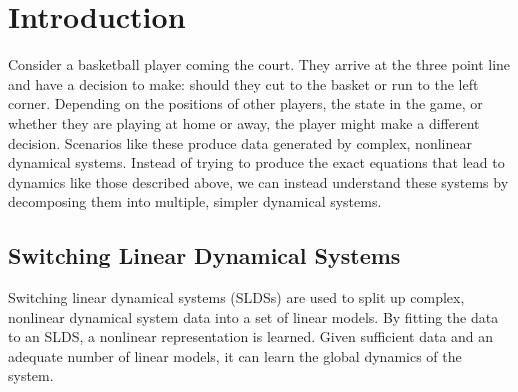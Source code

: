 
\section{Introduction}

Consider a basketball player coming the court. They arrive at the three point line and have a decision to make: should they cut to the basket or run to the left corner. Depending on the positions of other players, the state in the game, or whether they are playing at home or away, the player might make a different decision. Scenarios like these produce data generated by complex, nonlinear dynamical systems. Instead of trying to produce the exact equations that lead to dynamics like those described above, we can instead understand these systems by decomposing them into multiple, simpler dynamical systems.

\begin{comment}
The literature shows that this method is able to estimate complex nonlinear dynamics. With an increase in performance by extending the SLDS to recursive SLDS (rSLDS). The goal of this paper is to investigate if rSLDS is able to capture bifurcations efficiently. To investigate this we take a look at different systems where we know the dynamics and the bifurcations in it. There is chosen to look at a hopf bifurcation in the Van der Pol oscillator additionally we studied the normal for of a Bautin bifurcation. 


The report is structured in the following manner, below we introduce the mathematical frame work and findings described in the paper. Section 2 we reproduce some results presented in the paper. The third section our results to the our investigation on bifurcation is presented and finally Section 4 concludes our findings and discusses limitations and potential future research directions.
\end{comment}

\subsection{Switching Linear Dynamical Systems}

Switching linear dynamical systems (SLDSs) are used to split up complex, nonlinear dynamical system data into a set of linear models. By fitting the data to an SLDS, a nonlinear representation is learned. Given sufficient data and an adequate number of linear models, it can learn the global dynamics of the system.

